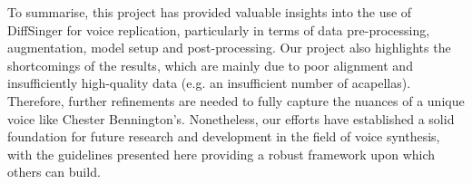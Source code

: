 \documentclass[a4paper]{article}
\begin{document}
To summarise, this project has provided valuable insights into the use of DiffSinger for voice replication, particularly in terms of data pre-processing, augmentation, model setup and post-processing. Our project also highlights the shortcomings of the results, which are mainly due to poor alignment and insufficiently high-quality data (e.g. an insufficient number of acapellas).  Therefore, further refinements are needed to fully capture the nuances of a unique voice like Chester Bennington's. Nonetheless, our efforts have established a solid foundation for future research and development in the field of voice synthesis, with the guidelines presented here providing a robust framework upon which others can build.


\end{document}
